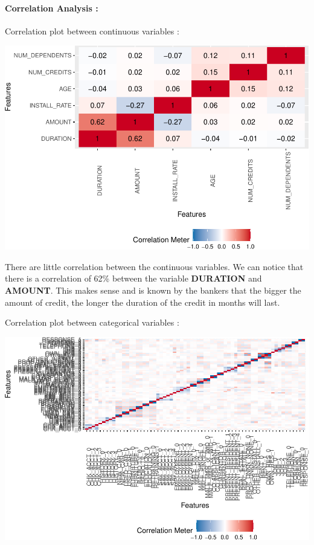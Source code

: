 \documentclass[
]{article}
\begin{document}
\hypertarget{correlation-analysis}{%
\paragraph{Correlation Analysis :}\label{correlation-analysis}}

Correlation plot between continuous variables :

\begin{center}\includegraphics{report_files/figure-latex/unnamed-chunk-11-1} \end{center}

There are little correlation between the continuous variables. We can
notice that there is a correlation of 62\% between the variable
\textbf{DURATION} and \textbf{AMOUNT}. This makes sense and is known by
the bankers that the bigger the amount of credit, the longer the
duration of the credit in months will last.

Correlation plot between categorical variables :

\begin{center}\includegraphics{report_files/figure-latex/unnamed-chunk-12-1} \end{center}
\end{document}

